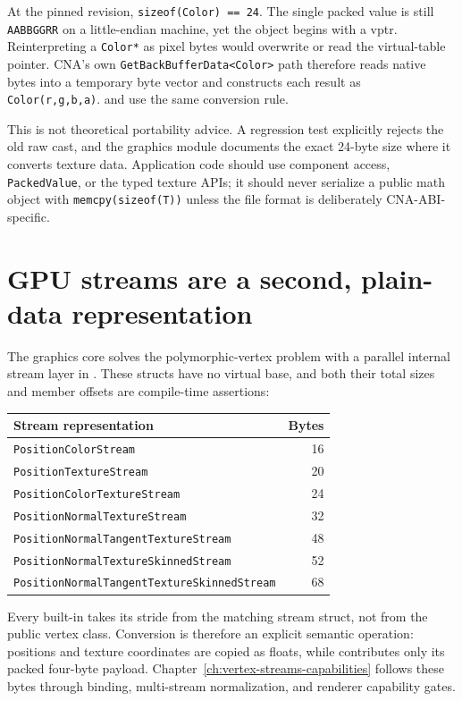 At the pinned revision, \texttt{sizeof(Color) == 24}.  The single packed value is still
\texttt{AABBGGRR} on a little-endian machine, yet the object begins with a vptr.  Reinterpreting a
\texttt{Color*} as pixel bytes would overwrite or read the virtual-table pointer.  CNA's own
\texttt{GetBackBufferData<Color>} path therefore reads native bytes into a temporary byte vector
and constructs each result as \texttt{Color(r,g,b,a)}.   and
 use the same conversion rule.

This is not theoretical portability advice.  A regression test explicitly rejects the old raw
cast, and the graphics module documents the exact 24-byte size where it converts texture data.
Application code should use component access, \texttt{PackedValue}, or the typed texture APIs; it
should never serialize a public math object with \texttt{memcpy(sizeof(T))} unless the file format
is deliberately CNA-ABI-specific.

\section{GPU streams are a second, plain-data representation}

The graphics core solves the polymorphic-vertex problem with a parallel internal stream layer in
.  These structs have
no virtual base, and both their total sizes and member offsets are compile-time assertions:

\begin{center}
\small
\begin{tabular}{lr}
\toprule
Stream representation & Bytes \\
\midrule
\texttt{PositionColorStream} & 16 \\
\texttt{PositionTextureStream} & 20 \\
\texttt{PositionColorTextureStream} & 24 \\
\texttt{PositionNormalTextureStream} & 32 \\
\texttt{PositionNormalTangentTextureStream} & 48 \\
\texttt{PositionNormalTextureSkinnedStream} & 52 \\
\texttt{PositionNormalTangentTextureSkinnedStream} & 68 \\
\bottomrule
\end{tabular}
\end{center}

Every built-in  takes its stride from the matching stream struct, not
from the public vertex class.  Conversion is therefore an explicit semantic operation: positions
and texture coordinates are copied as floats, while  contributes only its packed
four-byte payload.  Chapter~\ref{ch:vertex-streams-capabilities} follows these bytes through binding,
multi-stream normalization, and renderer capability gates.

